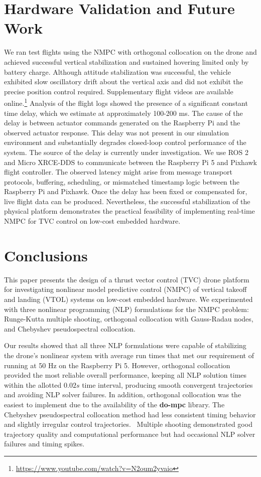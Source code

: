 \documentclass[conf]{new-aiaa}
\newcommand{\dompc}{{\bf do-mpc}}
\begin{document}
\section{Hardware Validation and Future Work}
\label{hardwarevalidation}
We ran test flights using the NMPC with orthogonal collocation on the drone and achieved successful vertical stabilization and sustained hovering limited only by battery charge. 
Although attitude stabilization was successful, the vehicle exhibited slow oscillatory drift about the vertical axis and did not exhibit the precise position control required.  Supplementary flight videos are available online.\footnote{\url{https://www.youtube.com/watch?v=N2oum2yvaio}}
Analysis of the flight logs showed the presence of a significant constant time delay, which we estimate at approximately 100-200 ms. The cause of the delay is between actuator commands generated on the Raspberry Pi and the observed actuator response. This delay was not present in our simulation environment and substantially degrades closed-loop control performance of the system.
The source of the delay is currently under investigation. We use ROS 2 and Micro XRCE-DDS to communicate between the Raspberry Pi 5 and Pixhawk flight controller. The observed latency might arise from message transport protocols, buffering, scheduling, or mismatched timestamp logic between the Raspberry Pi and Pixhawk. Once the delay has been fixed or compensated for, live flight data can be produced.
Nevertheless, the successful stabilization of the physical platform demonstrates the practical feasibility of implementing real-time NMPC for TVC control on low-cost embedded hardware.

\section{Conclusions}
\label{conclusion}


This paper presents the design of a thrust vector control (TVC) drone platform for investigating nonlinear model predictive control (NMPC) of vertical takeoff and landing (VTOL) systems on low-cost embedded hardware. We experimented with three nonlinear programming (NLP) formulations for the NMPC problem: Runge-Kutta multiple shooting, orthogonal collocation with Gauss-Radau nodes, and Chebyshev pseudospectral collocation.

Our results showed that all three NLP formulations were capable of stabilizing the drone’s nonlinear system with average run times that met our requirement of running at 50 Hz on the Raspberry Pi 5. However, orthogonal collocation provided the most reliable overall performance, keeping all NLP solution times within the allotted $0.02s$ time interval, producing smooth convergent trajectories and avoiding NLP solver failures. In addition, orthogonal collocation was the easiest to implement due to the availability of the {\dompc} library. The Chebyshev pseudospectral collocation method had less consistent timing behavior and slightly irregular control trajectories. 
Multiple shooting demonstrated good trajectory quality and computational performance but had occasional NLP solver failures and timing spikes.
\end{document}
